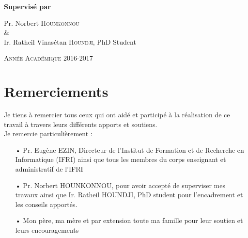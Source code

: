\documentclass[12pt,a4paper]{article}
\begin{document}
\begin{titlepage}
		\vspace{1cm}{\scshape\Large Institut de Formation de Recherche en Informatique (IFRI)\par}
		\vspace{1cm}{\scshape\Large Mémoire pour l'obtention du diplôme de Master en Systèmes d'Information et Réseaux Informatiques\par}
		\vspace{1.5cm}{\huge\bfseries Résolution de "Pigment Sequencing Problem" avec les algorithmes génétiques\par}
		\vfill
		\Large\textbf{Supervisé par}\par Pr. Norbert \textsc{Hounkonnou} \\ \& \\ Ir. Ratheil Vinasétan \textsc{Houndji}, PhD Student
		\vfill
		{\large \scshape Année Académique 2016-2017 \par}
	\end{titlepage}

	\newpage %
	
	\section*{Remerciements}
	
	\vspace{2.5cm}
	
	Je tiens à remercier tous ceux qui ont aidé et participé à la réalisation de ce travail à travers leurs différents apports et soutiens. \\
	\hspace*{.5cm}Je remercie particulièrement : \\
	\begin{itemize}
		\item[•] Pr. Eugène EZIN, Directeur de l'Institut de Formation et de Recherche en Informatique (IFRI) ainsi que tous les membres du corps enseignant et administratif de l'IFRI
		\item[•] Pr. Norbert HOUNKONNOU, pour avoir accepté de superviser mes travaux ainsi que Ir. Ratheil HOUNDJI, PhD student pour l'encadrement et les conseils apportés.
		\item[•] Mon père, ma mère et par extension toute ma famille pour leur soutien et leurs encouragements  
	\end{itemize}
	
\end{document}
